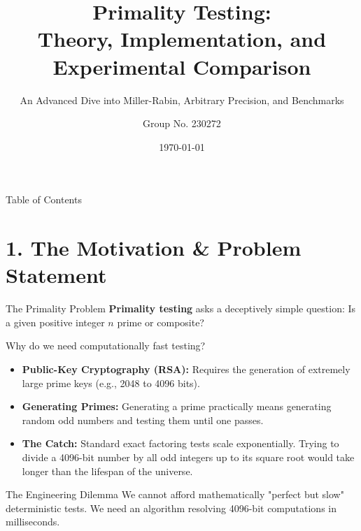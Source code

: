 \documentclass[10pt, compress]{beamer}
\title[CS648: Primality Testing]{Primality Testing:\\Theory, Implementation, and Experimental Comparison}
\subtitle{An Advanced Dive into Miller-Rabin, Arbitrary Precision, and Benchmarks}
\author[Group 230272]{Group No. 230272}
\institute[CS648]{CS648 Project Presentation}
\date{\today}
\begin{document}
\begin{frame}
    \titlepage
\end{frame}
\begin{frame}{Table of Contents}
    \tableofcontents[hideallsubsections]
\end{frame}
\section{1. The Motivation \& Problem Statement}
\begin{frame}{The Primality Problem}
    \textbf{Primality testing} asks a deceptively simple question: Is a given positive integer $n$ prime or composite?
    
    \pause
    \vspace{0.3cm}
    Why do we need computationally fast testing?
    \begin{itemize}
        \item<3-> \textbf{Public-Key Cryptography (RSA):} Requires the generation of extremely large prime keys (e.g., 2048 to 4096 bits).
        \item<4-> \textbf{Generating Primes:} Generating a prime practically means generating random odd numbers and testing them until one passes.
        \item<5-> \textbf{The Catch:} Standard exact factoring tests scale exponentially. Trying to divide a 4096-bit number by all odd integers up to its square root would take longer than the lifespan of the universe.
    \end{itemize}
    
    \begin{alertblock}{The Engineering Dilemma}
    We cannot afford mathematically "perfect but slow" deterministic tests. We need an algorithm resolving 4096-bit computations in milliseconds.
    \end{alertblock}
\end{frame}
\end{document}
